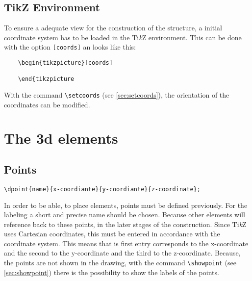 \documentclass[%
  a4paper,
  BCOR20mm,
  pointlessnumbers,
  twoside,
  halfparskip,
  openright,
]{scrreprt}
\newcommand{\tikzsym}{Ti\emph{k}Z }
\begin{document}
\subsection{TikZ Environment}
\label{sec:TikZUmgebung}

To ensure a adequate view for the construction of the structure, a initial coordinate system has to be loaded in the \tikzsym environment. This can be done with the option \lstinline|[coords]| an looks like this:

\begin{lstlisting}
	\begin{tikzpicture}[coords]

	\end{tikzpicture
\end{lstlisting}\vspace{-7mm}
%
With the command \lstinline|\setcoords| (see \ref{sec:setcoords}), the orientation of the coordinates can be modified.


\section{The 3d elements}
\label{sec:Die3DElemente}



\subsection{Points}
\label{sec:Punkte}
\begingroup
\lstinline[emph={dpoint}]|\dpoint{name}{x-coordiante}{y-coordiante}{z-coordinate};| 

\leftskip=7mm In order to be able, to place elements, points must be defined previously. For the labeling a short and precise name should be chosen. Because other elements will reference back to these points, in the later stages of the construction. Since \tikzsym uses Cartesian coordinates, this must be entered in accordance with the coordinate system. This means that is first entry corresponds to the x-coordinate and the second to the y-coordinate and the third to the z-coordinate. Because, the points are not shown in the drawing, with the command \lstinline|\showpoint| (see \ref{sec:showpoint}) there is the possibility to show the labels of the points.
\end{document}
